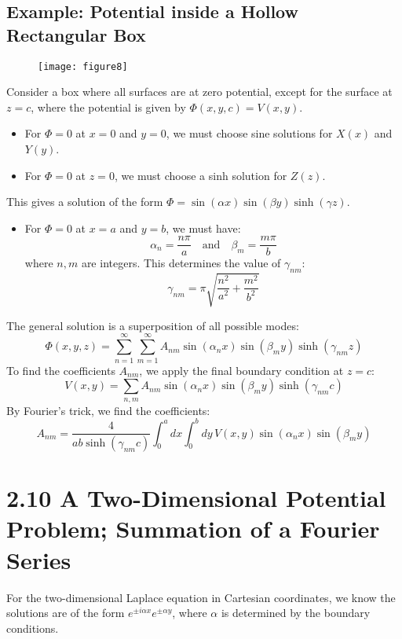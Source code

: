 \documentclass{article}
\begin{document}
	\subsection*{Example: Potential inside a Hollow Rectangular Box}
	
	\begin{figure}[h]
		\centering
		\texttt{[image: figure8]}
		\caption{}
		\label{fig:figure8}
	\end{figure}
	
	
	Consider a box where all surfaces are at zero potential, except for the surface at \(z=c\), where the potential is given by \(\Phi(x,y,c) = V(x,y)\).
	\begin{itemize}
		\item For \(\Phi=0\) at \(x=0\) and \(y=0\), we must choose sine solutions for \(X(x)\) and \(Y(y)\).
		\item For \(\Phi=0\) at \(z=0\), we must choose a sinh solution for \(Z(z)\).
	\end{itemize}
	This gives a solution of the form \(\Phi = \sin(\alpha x)\sin(\beta y)\sinh(\gamma z)\).
	\begin{itemize}
		\item For \(\Phi=0\) at \(x=a\) and \(y=b\), we must have:
		\[
		\alpha_n = \frac{n\pi}{a} \quad \text{and} \quad \beta_m = \frac{m\pi}{b}
		\]
		where \(n, m\) are integers. This determines the value of \(\gamma_{nm}\):
		\[
		\gamma_{nm} = \pi \sqrt{\frac{n^2}{a^2} + \frac{m^2}{b^2}}
		\]
	\end{itemize}
	The general solution is a superposition of all possible modes:
	\[
	\Phi(x,y,z) = \sum_{n=1}^{\infty} \sum_{m=1}^{\infty} A_{nm} \sin(\alpha_n x) \sin(\beta_m y) \sinh(\gamma_{nm} z)
	\]
	To find the coefficients \(A_{nm}\), we apply the final boundary condition at \(z=c\):
	\[
	V(x,y) = \sum_{n,m} A_{nm} \sin(\alpha_n x) \sin(\beta_m y) \sinh(\gamma_{nm} c)
	\]
	By Fourier's trick, we find the coefficients:
	\[
	A_{nm} = \frac{4}{ab \sinh(\gamma_{nm}c)} \int_0^a dx \int_0^b dy \, V(x,y) \sin(\alpha_n x) \sin(\beta_m y)
	\]
	
	\hrulefill
	
	\section*{2.10 A Two-Dimensional Potential Problem; Summation of a Fourier Series}
	
	For the two-dimensional Laplace equation in Cartesian coordinates, we know the solutions are of the form \(e^{\pm i \alpha x} e^{\pm \alpha y}\), where \(\alpha\) is determined by the boundary conditions.
	
\end{document}

